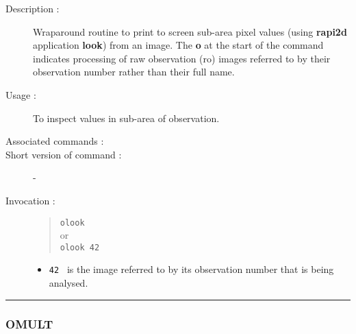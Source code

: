 \begin{description}

\item[Description :] Wraparound routine to print to screen sub-area
pixel values (using {\bf rapi2d} application {\bf look}) from an image. The
{\bf o} at the start of the command indicates processing of raw observation
({\sc ro}) images referred to by their observation number rather than
their full name.

\item[Usage :] To inspect values in sub-area of observation.
\item[Associated commands :] {\tt {}}
\item[Short version of command :] -
\item[Invocation :]

\begin{quote}{\tt  olook }\\
or \\
{\tt olook 42 }
\end{quote}

\begin{itemize}

\item {\tt 42 } is the image referred to by its observation number that
  is being analysed.
\end{itemize}

\end{description}

\hrule 
\subsubsection*{\label{OMULT}OMULT}

